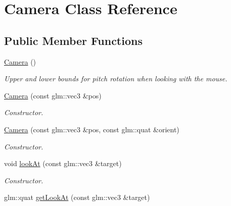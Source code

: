 \hypertarget{class_camera}{\section{Camera Class Reference}
\label{class_camera}
}
\subsection*{Public Member Functions}
\begin{DoxyCompactItemize}
\item 
\hypertarget{class_camera_a01f94c3543f56ede7af49dc778f19331}{\hyperlink{class_camera_a01f94c3543f56ede7af49dc778f19331}{Camera} ()}\label{class_camera_a01f94c3543f56ede7af49dc778f19331}

\begin{DoxyCompactList}\small\item\em Upper and lower bounds for pitch rotation when looking with the mouse. \end{DoxyCompactList}\item 
\hypertarget{class_camera_acee2a1b3d56b0f141a3c6ee82735ed39}{\hyperlink{class_camera_acee2a1b3d56b0f141a3c6ee82735ed39}{Camera} (const glm\+::vec3 \&pos)}\label{class_camera_acee2a1b3d56b0f141a3c6ee82735ed39}

\begin{DoxyCompactList}\small\item\em Constructor. \end{DoxyCompactList}\item 
\hypertarget{class_camera_a9e5dda23dca2ae363424f7a9025f55c9}{\hyperlink{class_camera_a9e5dda23dca2ae363424f7a9025f55c9}{Camera} (const glm\+::vec3 \&pos, const glm\+::quat \&orient)}\label{class_camera_a9e5dda23dca2ae363424f7a9025f55c9}

\begin{DoxyCompactList}\small\item\em Constructor. \end{DoxyCompactList}\item 
\hypertarget{class_camera_aec0442093303b9568a159f8c87f8b7d8}{void \hyperlink{class_camera_aec0442093303b9568a159f8c87f8b7d8}{look\+At} (const glm\+::vec3 \&target)}\label{class_camera_aec0442093303b9568a159f8c87f8b7d8}

\begin{DoxyCompactList}\small\item\em Constructor. \end{DoxyCompactList}\item 
\hypertarget{class_camera_a963fa4d081fe59425d6b939c4aa9853d}{glm\+::quat \hyperlink{class_camera_a963fa4d081fe59425d6b939c4aa9853d}{get\+Look\+At} (const glm\+::vec3 \&target)}\label{class_camera_a963fa4d081fe59425d6b939c4aa9853d}


\end{DoxyCompactItemize}
